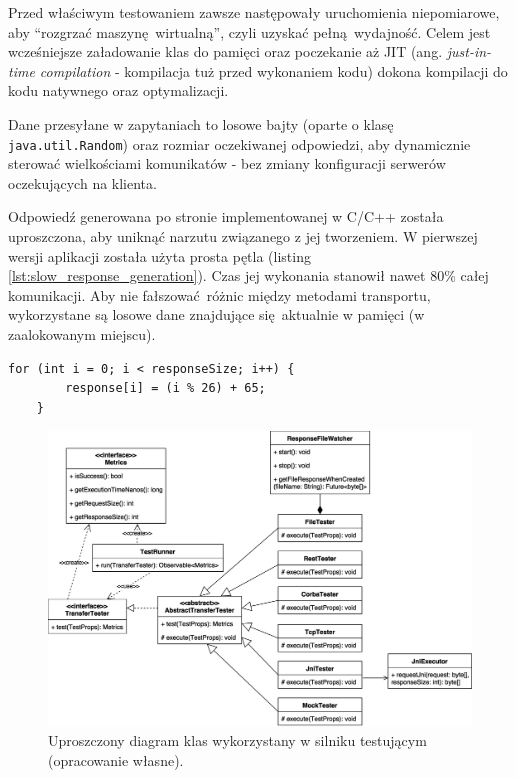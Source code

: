 Przed właściwym testowaniem zawsze następowały uruchomienia niepomiarowe, aby \enquote{rozgrzać maszynę wirtualną}, czyli uzyskać pełną wydajność. Celem jest wcześniejsze załadowanie klas do pamięci oraz poczekanie aż JIT (ang. \textit{just-in-time compilation} - kompilacja tuż przed wykonaniem kodu) dokona kompilacji do kodu natywnego oraz optymalizacji.

\label{data_generation}
Dane przesyłane w zapytaniach to losowe bajty (oparte o klasę \texttt{java.util.Random}) oraz rozmiar oczekiwanej odpowiedzi, aby dynamicznie sterować wielkościami komunikatów - bez zmiany konfiguracji serwerów oczekujących na klienta.

Odpowiedź generowana po stronie implementowanej w C/C++ została uproszczona, aby uniknąć narzutu związanego z jej tworzeniem. W pierwszej wersji aplikacji została użyta prosta pętla (listing \ref{lst:slow_response_generation}).
Czas jej wykonania stanowił nawet 80\% całej komunikacji. Aby nie fałszować różnic między metodami transportu, wykorzystane są losowe dane znajdujące się aktualnie w pamięci (w zaalokowanym miejscu).

\begin{lstlisting}[caption={Sposób generowania odpowiedzi, który okazał się zbyt niewydajny, aby móc go zastosować.},captionpos=b,label={lst:slow_response_generation}]
    for (int i = 0; i < responseSize; i++) {
        response[i] = (i % 26) + 65;
    }
\end{lstlisting}

\begin{figure}[H]
    \centering
    \includegraphics[width=\textwidth,height=\textheight,keepaspectratio]{img/class_diagram.png}
    \caption{Uproszczony diagram klas wykorzystany w silniku testującym (opracowanie własne).}
\end{figure}

